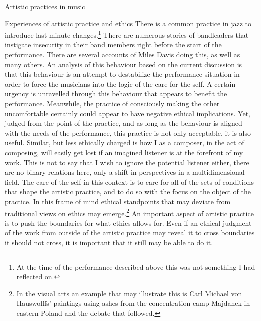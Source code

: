 \documentclass[presentation]{beamer}
\begin{document}
\begin{frame}[label={sec:org952e88c}]{Artistic practices in music}
\begin{block}{Experiences of artistic practice and ethics}
There is a common practice in jazz to introduce last minute changes.\footnote{At the time of the performance described above this was not something I had reflected on.} There are numerous stories of bandleaders that instigate insecurity in their band members right before the start of the performance. There are several accounts of Miles Davis doing this, as well as many others. An analysis of this behaviour based on the current discussion is that this behaviour is an attempt to destabilize the performance situation in order to force the musicians into the logic of the care for the self. A certain urgency is unravelled through this behaviour that appears to benefit the performance. Meanwhile, the practice of consciously making the other uncomfortable certainly could appear to have negative ethical implications. Yet, judged from the point of the practice, and as long as the behaviour is aligned with the needs of the performance, this practice is not only acceptable, it is also useful. Similar, but less ethically charged is how I as a composer, in the act of composing, will easily get lost if an imagined listener is at the forefront of my work. This is not to say that I wish to ignore the potential listener either, there are no binary relations here, only a shift in perspectives in a multidimensional field. The care of the self in this context is to care for all of the sets of conditions that shape the artistic practice, and to do so with the focus on the object of the practice. In this frame of mind ethical standpoints that may deviate from traditional views on ethics may emerge.\footnote{In the visual arts an example that may illustrate this is Carl Michael von Hauswolffs' paintings using ashes from the concentration camp Majdanek in eastern Poland and the debate that followed.} An important aspect of artistic practice is to push the boundaries for what ethics allows for. Even if an ethical judgment of the work from outside of the artistic practice may reveal it to cross boundaries it should not cross, it is important that it still may be able to do it.


\end{block}
\end{frame}
\end{document}
